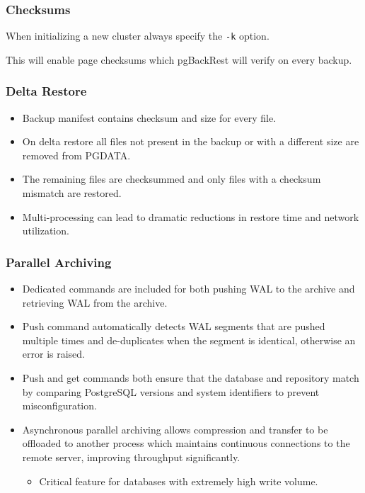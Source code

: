 \begin{frame}
    \frametitle{Checksums}

    When initializing a new cluster always specify the \texttt{-k} option.

    This will enable page checksums which pgBackRest will verify on every backup.
\end{frame}

\begin{frame}
    \frametitle{Delta Restore}

    \begin{itemize}
        \item Backup manifest contains checksum and size for every file.\pause
        \item On delta restore all files not present in the backup or with a different size are removed from PGDATA.\pause
        \item The remaining files are checksummed and only files with a checksum mismatch are restored.\pause
        \item Multi-processing can lead to dramatic reductions in restore time and network utilization.
    \end{itemize}
\end{frame}

\begin{frame}
    \frametitle{Parallel Archiving}

    \begin{itemize}
        \item Dedicated commands are included for both pushing WAL to the archive and retrieving WAL from the archive.\pause
        \item Push command automatically detects WAL segments that are pushed multiple times and de-duplicates when the segment is identical, otherwise an error is raised.\pause
        \item Push and get commands both ensure that the database and repository match by comparing PostgreSQL versions and system identifiers to prevent misconfiguration.\pause

        \item Asynchronous parallel archiving allows compression and transfer to be offloaded to another process which maintains continuous connections to the remote server, improving throughput significantly.\pause

            \begin{itemize}
                \item Critical feature for databases with extremely high write volume.
            \end{itemize}
    \end{itemize}
\end{frame}

